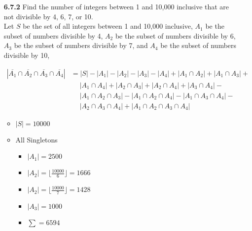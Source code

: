 \documentclass[12pt]{article}
\begin{document}


\begin{enumerate}
    \item[\bf 6.7.2] Find the number of integers between 1 and 10,000 inclusive that are not divisible by 4, 6, 7, or 10.\\

    Let $S$ be the set of all integers between 1 and 10,000 inclusive, $A_1$ be the subset of numbers divisible by 4, $A_2$ be the subset of numbers divisible by 6, $A_3$ be the subset of numbers divisible by 7, and $A_4$ be the subset of numbers divisible by 10,

    \begin{align*}
        |\overline{A_1} \cap \overline{A_2} \cap \overline{A_3} \cap \overline{A_4}| &= |S| - |A_1| - |A_2| - |A_3| - |A_4| + |A_1 \cap A_2| + |A_1 \cap A_3| + \\
        &\quad\;|A_1\cap A_4| + |A_2 \cap A_3| + |A_2\cap A_4| + |A_3\cap A_4| - \\
        &\quad\; |A_1\cap A_2\cap A_3| - |A_1\cap A_2 \cap A_4| - |A_1\cap A_3\cap A_4| -  \\
        &\quad\; |A_2\cap A_3\cap A_4| + |A_1\cap A_2\cap A_3\cap A_4|
    \end{align*}

    \begin{itemize}
        \item $|S| = 10000$
        \item All Singletons
        \begin{itemize}
            \item $|A_1| = 2500$
            \item $|A_2| = \lfloor \frac{10000}{6}\rfloor = 1666$
            \item $|A_2| = \lfloor \frac{10000}{7}\rfloor = 1428$
            \item $|A_3| = 1000$
            \item $\sum = 6594$\\
        \end{itemize}


\end{itemize}
\end{enumerate}
\end{document}
